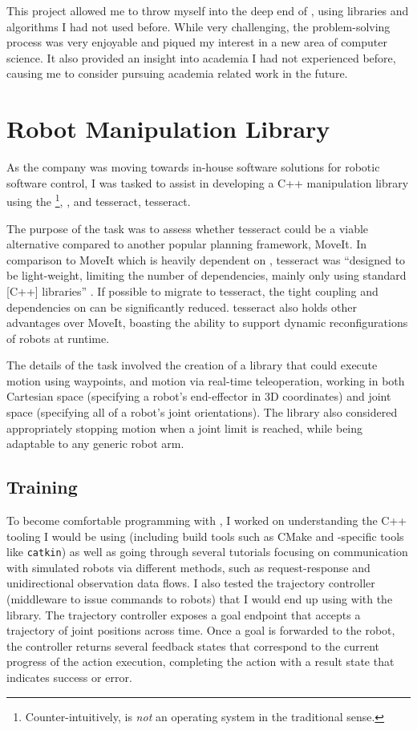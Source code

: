 This project allowed me to throw myself into the deep end of , using libraries and
algorithms I had not used before. While very challenging, the problem-solving process was very
enjoyable and piqued my interest in a new area of computer science. It also provided an insight into
academia I had not experienced before, causing me to consider pursuing academia related work in the
future.

\section{Robot Manipulation Library}
\label{sec:robot-library}

As the company was moving towards in-house software solutions for robotic software control, I was
tasked to assist in developing a C++ manipulation library using the
\footnote{Counter-intuitively,  is \emph{not} an operating system in the
    traditional sense.}, , and \gls*{tesseract}, \glsdesc*{tesseract}.

The purpose of the task was to assess whether \gls*{tesseract} could be a viable alternative
compared to another popular planning framework, MoveIt. In comparison to MoveIt which is heavily
dependent on , \gls*{tesseract} was \enquote{designed to be light-weight, limiting the
    number of dependencies, mainly only using standard [C++] libraries} \autocite{tesseractgithub}. If
possible to migrate to \gls*{tesseract}, the tight coupling and dependencies on  can be
significantly reduced. \gls*{tesseract} also holds other advantages over MoveIt, boasting the
ability to support dynamic reconfigurations of robots at runtime.

The details of the task involved the creation of a library that could execute motion using
waypoints, and motion via real-time teleoperation, working in both Cartesian space
(specifying a robot's end-effector in 3D coordinates) and joint space (specifying all of a robot's
joint orientations). The library also considered appropriately stopping motion when a joint limit is
reached, while being adaptable to any generic robot arm.

\subsection{Training}

To become comfortable programming with , I worked on understanding the C++ tooling I would
be using (including build tools such as CMake and -specific tools like \texttt{catkin}) as
well as going through several tutorials focusing on communication with simulated robots via
different methods, such as request-response and unidirectional observation data flows. I also tested
the trajectory controller (middleware to issue commands to robots) that I would end up using with
the library. The trajectory controller exposes a goal endpoint that accepts a trajectory
of joint positions across time. Once a goal is forwarded to the robot, the controller returns
several feedback states that correspond to the current progress of the action execution,
completing the action with a result state that indicates success or error.

